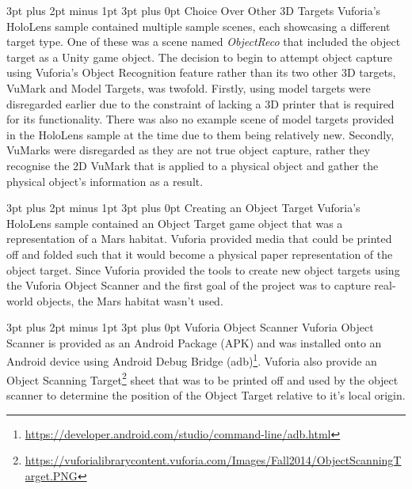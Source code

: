 \documentclass[12pt,a4paper,oneside]{article}
\makeatletter
\renewcommand\paragraph{\@startsection {paragraph}{1}{0mm} %
	                           {3pt plus 2pt minus 1pt} %
	                           {3pt plus 0pt} %
	                           {\normalfont}}
\makeatother
\begin{document}
\paragraph{Choice Over Other 3D Targets}
Vuforia's HoloLens sample contained multiple sample scenes, each showcasing a different target type. One of these was a scene named \textit{ObjectReco} that included the object target as a Unity game object. The decision to begin to attempt object capture using Vuforia's Object Recognition feature rather than its two other 3D targets, VuMark and Model Targets, was twofold. Firstly, using model targets were disregarded earlier due to the constraint of lacking a 3D printer that is required for its functionality. There was also no example scene of model targets provided in the HoloLens sample at the time due to them being relatively new. Secondly, VuMarks were disregarded as they are not true object capture, rather they recognise the 2D VuMark that is applied to a physical object and gather the physical object's information as a result.

\paragraph{Creating an Object Target}
Vuforia's HoloLens sample contained an Object Target game object that was a representation of a Mars habitat. Vuforia provided media that could be printed off and folded such that it would become a physical paper representation of the object target. Since Vuforia provided the tools to create new object targets using the Vuforia Object Scanner and the first goal of the project was to capture real-world objects, the Mars habitat wasn't used.

\paragraph{Vuforia Object Scanner}
Vuforia Object Scanner is provided as an Android Package (APK) and was installed onto an Android device using Android Debug Bridge (adb)\footnote{\url{https://developer.android.com/studio/command-line/adb.html}}. Vuforia also provide an Object Scanning Target\footnote{\url{https://vuforialibrarycontent.vuforia.com/Images/Fall2014/ObjectScanningTarget.PNG}} sheet that was to be printed off and used by the object scanner to determine the position of the Object Target relative to it's local origin.
\end{document}
